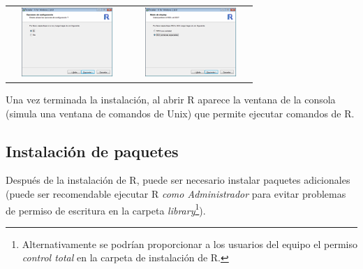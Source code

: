 \documentclass[
]{book}
\begin{document}
\begin{longtable}[]{@{}cc@{}}
\includegraphics[width=0.8\textwidth,height=\textheight]{images/image5.png} & \includegraphics[width=0.8\textwidth,height=\textheight]{images/image6.png} \\
\end{longtable}

Una vez terminada la instalación, al abrir R aparece la ventana de la consola (simula una ventana de comandos de Unix) que permite ejecutar comandos de R.

\hypertarget{instalaciuxf3n-de-paquetes}{%
\subsection{Instalación de paquetes}\label{instalaciuxf3n-de-paquetes}}

Después de la instalación de R, puede ser necesario instalar paquetes adicionales (puede ser recomendable ejecutar R \emph{como Administrador} para evitar problemas de permiso de escritura en la carpeta \emph{library}\footnote{Alternativamente se podrían proporcionar a los usuarios del equipo el permiso \emph{control total} en la carpeta de instalación de R.}).
\end{document}
